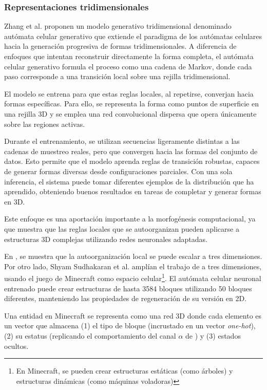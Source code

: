 \subsubsection{Representaciones tridimensionales}

Zhang et al. \cite{GCA} proponen un modelo generativo tridimensional denominado autómata celular generativo que extiende el paradigma de los autómatas celulares hacia la generación progresiva de formas tridimensionales. A diferencia de enfoques que intentan reconstruir directamente la forma completa, el autómata celular generativo formula el proceso como una cadena de Markov, donde cada paso corresponde a una transición local sobre una rejilla tridimensional. 

El modelo se entrena para que estas reglas locales, al repetirse, converjan hacia formas específicas. Para ello, se representa la forma como puntos de superficie en una rejilla 3D y se emplea una red convolucional dispersa que opera únicamente sobre las regiones activas.

Durante el entrenamiento, se utilizan secuencias ligeramente distintas a las cadenas de muestreo reales, pero que convergen hacia las formas del conjunto de datos. Esto permite que el modelo aprenda reglas de transición robustas, capaces de generar formas diversas desde configuraciones parciales. Con una sola inferencia, el sistema puede tomar diferentes ejemplos de la distribución que ha aprendido, obteniendo buenos resultados en tareas de completar y generar formas en 3D.

Este enfoque es una aportación importante a la morfogénesis computacional, ya que muestra que las reglas locales que se autoorganizan pueden aplicarse a estructuras 3D complejas utilizando redes neuronales adaptadas.

En \cite{GCA}, se muestra que la autoorganización local se puede escalar a tres dimensiones. Por otro lado, Shyam Sudhakaran et al. \cite{NCA3D} amplían el trabajo de \cite{mordvintsevNCA} a tres dimensiones, usando el juego de Minecraft como espacio celular\footnote{En Minecraft, se pueden crear estructuras estáticas (como árboles) y estructuras dinámicas (como máquinas voladoras)}. El autómata celular neuronal entrenado puede crear estructuras de hasta 3584 bloques utilizando 50 bloques diferentes, manteniendo las propiedades de regeneración de su versión en 2D.

Una entidad en Minecraft se representa como una red 3D donde cada elemento es un vector que almacena (1) el tipo de bloque (incrustado en un vector \textit{one-hot}), (2) su estatus (replicando el comportamiento del canal $\alpha$ de \cite{mordvintsevNCA}) y (3) estados ocultos.

